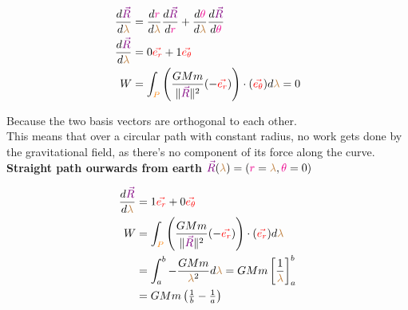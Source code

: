 \begin{align*}
    \frac{d\begingroup\color{violet}\vec{R}\endgroup}{d\begingroup\color{brown}\lambda\endgroup} &= 
    \frac{d\begingroup\color{magenta}r\endgroup}{d\begingroup\color{brown}\lambda\endgroup} \frac{d\begingroup\color{violet}\vec{R}\endgroup}{d\begingroup\color{magenta}r\endgroup} +
    \frac{d\begingroup\color{magenta}\theta\endgroup}{d\begingroup\color{brown}\lambda\endgroup} \frac{d\begingroup\color{violet}\vec{R}\endgroup}{d\begingroup\color{magenta}\theta\endgroup}\\ 
    \frac{d\begingroup\color{violet}\vec{R}\endgroup}{d\begingroup\color{brown}\lambda\endgroup} &= 
    0 \begingroup\color{red}\vec{e_r}\endgroup + 1\begingroup\color{red}\vec{e_{\theta}}\endgroup\\
    W &= \int_{\begingroup\color{orange}P\endgroup} \left(\frac{GMm}{\|\begingroup\color{violet}\vec{R}\endgroup\|^2}(-\begingroup\color{red}\vec{e_r}\endgroup)\right) \cdot (\begingroup\color{red}\vec{e_{\theta}}\endgroup) d\begingroup\color{brown}\lambda\endgroup = 0
\end{align*}

Because the two basis vectors are orthogonal to each other.\\
This means that over a circular path with constant radius, no work gets done by the gravitational field, as there's no component of its force along the curve.\\

\textbf{Straight path ourwards from earth} $\begingroup\color{violet}\vec{R}\endgroup(\begingroup\color{brown}\lambda\endgroup) = (\begingroup\color{magenta}r\endgroup = \begingroup\color{brown}\lambda\endgroup, \begingroup\color{magenta}\theta\endgroup = 0)$

\begin{align*}
    \frac{d\begingroup\color{violet}\vec{R}\endgroup}{d\begingroup\color{brown}\lambda\endgroup} &= 1\begingroup\color{red}\vec{e_r}\endgroup + 0\begingroup\color{red}\vec{e_{\theta}}\endgroup\\
    W &= \int_{\begingroup\color{orange}P\endgroup} \left(\frac{GMm}{\|\begingroup\color{violet}\vec{R}\endgroup\|^2}(-\begingroup\color{red}\vec{e_r}\endgroup)\right) \cdot (\begingroup\color{red}\vec{e_r}\endgroup) d\begingroup\color{brown}\lambda\endgroup\\
    &= \int_a^b -\frac{GMm}{\begingroup\color{brown}\lambda\endgroup^2} d\begingroup\color{brown}\lambda\endgroup
    = GMm \left[\frac{1}{\begingroup\color{brown}\lambda\endgroup} \right]^b_a\\
    &= GMm\left(\tfrac{1}{b} - \tfrac{1}{a}\right)
\end{align*}

